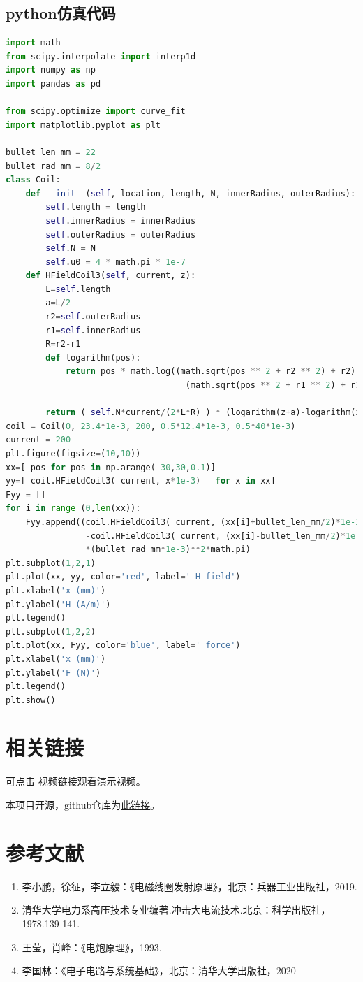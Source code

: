 \documentclass{article}
\begin{document}
\subsection{python仿真代码}
\begin{lstlisting}[language=Python,caption=force.py]
import math
from scipy.interpolate import interp1d  
import numpy as np
import pandas as pd  

from scipy.optimize import curve_fit  
import matplotlib.pyplot as plt  

bullet_len_mm = 22
bullet_rad_mm = 8/2
class Coil:  
    def __init__(self, location, length, N, innerRadius, outerRadius):  
        self.length = length     
        self.innerRadius = innerRadius 
        self.outerRadius = outerRadius  
        self.N = N                      
        self.u0 = 4 * math.pi * 1e-7     
    def HFieldCoil3(self, current, z):  
        L=self.length
        a=L/2
        r2=self.outerRadius
        r1=self.innerRadius
        R=r2-r1
        def logarithm(pos):  
            return pos * math.log((math.sqrt(pos ** 2 + r2 ** 2) + r2) /  
                                    (math.sqrt(pos ** 2 + r1 ** 2) + r1))  
            
        return ( self.N*current/(2*L*R) ) * (logarithm(z+a)-logarithm(z-a)) 
coil = Coil(0, 23.4*1e-3, 200, 0.5*12.4*1e-3, 0.5*40*1e-3)  
current = 200  
plt.figure(figsize=(10,10))
xx=[ pos for pos in np.arange(-30,30,0.1)]
yy=[ coil.HFieldCoil3( current, x*1e-3)   for x in xx]
Fyy = []
for i in range (0,len(xx)):
    Fyy.append((coil.HFieldCoil3( current, (xx[i]+bullet_len_mm/2)*1e-3)
                -coil.HFieldCoil3( current, (xx[i]-bullet_len_mm/2)*1e-3))
                *(bullet_rad_mm*1e-3)**2*math.pi)
plt.subplot(1,2,1)
plt.plot(xx, yy, color='red', label=' H field')  
plt.xlabel('x (mm)')  
plt.ylabel('H (A/m)')  
plt.legend()  
plt.subplot(1,2,2)
plt.plot(xx, Fyy, color='blue', label=' force')
plt.xlabel('x (mm)')
plt.ylabel('F (N)')
plt.legend()
plt.show()

\end{lstlisting}
\section{相关链接}
可点击
\href{https://www.bilibili.com/video/BV1nJpbeAEKk/?share_source=copy_web&vd_source=4597eff6ca01ce40fa5a055d7830e7c7}{视频链接}观看演示视频。

本项目开源，github仓库为\href{https://github.com/CBDT-JWT/autoE_Mgun}{此链接}。

\section{参考文献}
\begin{enumerate}
    \item 李小鹏，徐征，李立毅：《电磁线圈发射原理》，北京：兵器工业出版社，2019.
    \item 清华大学电力系高压技术专业编著.冲击大电流技术.北京：科学出版社，1978.139-141.
    \item 王莹，肖峰：《电炮原理》，1993.
    \item 李国林：《电子电路与系统基础》，北京：清华大学出版社，2020

\end{enumerate}
\end{document}
